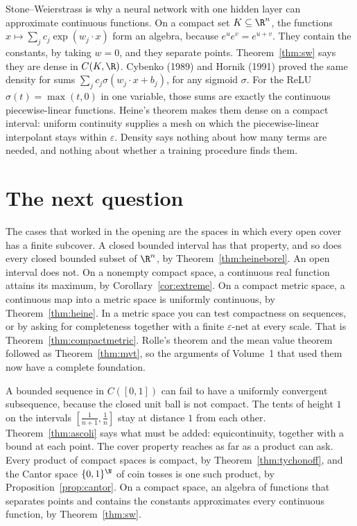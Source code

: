 \begin{remark}
Stone--Weierstrass is why a neural network with one hidden layer can approximate continuous functions. On a compact set $K\subseteq\R^n$, the functions $x\mapsto\sum_j c_j\exp(w_j\cdot x)$ form an algebra, because $e^{u}e^{v}=e^{u+v}$. They contain the constants, by taking $w=0$, and they separate points. Theorem~\ref{thm:sw} says they are dense in $C(K,\R)$. Cybenko (1989) and Hornik (1991) proved the same density for sums $\sum_j c_j\sigma(w_j\cdot x+b_j)$, for any sigmoid $\sigma$. For the ReLU $\sigma(t)=\max(t,0)$ in one variable, those sums are exactly the continuous piecewise-linear functions. Heine's theorem makes them dense on a compact interval: uniform continuity supplies a mesh on which the piecewise-linear interpolant stays within $\varepsilon$. Density says nothing about how many terms are needed, and nothing about whether a training procedure finds them.
\end{remark}

\section{The next question}

The cases that worked in the opening are the spaces in which every open cover has a finite subcover. A closed bounded interval has that property, and so does every closed bounded subset of $\R^n$, by Theorem~\ref{thm:heineborel}. An open interval does not. On a nonempty compact space, a continuous real function attains its maximum, by Corollary~\ref{cor:extreme}. On a compact metric space, a continuous map into a metric space is uniformly continuous, by Theorem~\ref{thm:heine}. In a metric space you can test compactness on sequences, or by asking for completeness together with a finite $\varepsilon$-net at every scale. That is Theorem~\ref{thm:compactmetric}. Rolle's theorem and the mean value theorem followed as Theorem~\ref{thm:mvt}, so the arguments of Volume~1 that used them now have a complete foundation.

A bounded sequence in $C([0,1])$ can fail to have a uniformly convergent subsequence, because the closed unit ball is not compact. The tents of height $1$ on the intervals $[\frac1{n+1},\frac1n]$ stay at distance $1$ from each other. Theorem~\ref{thm:ascoli} says what must be added: equicontinuity, together with a bound at each point. The cover property reaches as far as a product can ask. Every product of compact spaces is compact, by Theorem~\ref{thm:tychonoff}, and the Cantor space $\{0,1\}^\N$ of coin tosses is one such product, by Proposition~\ref{prop:cantor}. On a compact space, an algebra of functions that separates points and contains the constants approximates every continuous function, by Theorem~\ref{thm:sw}.

